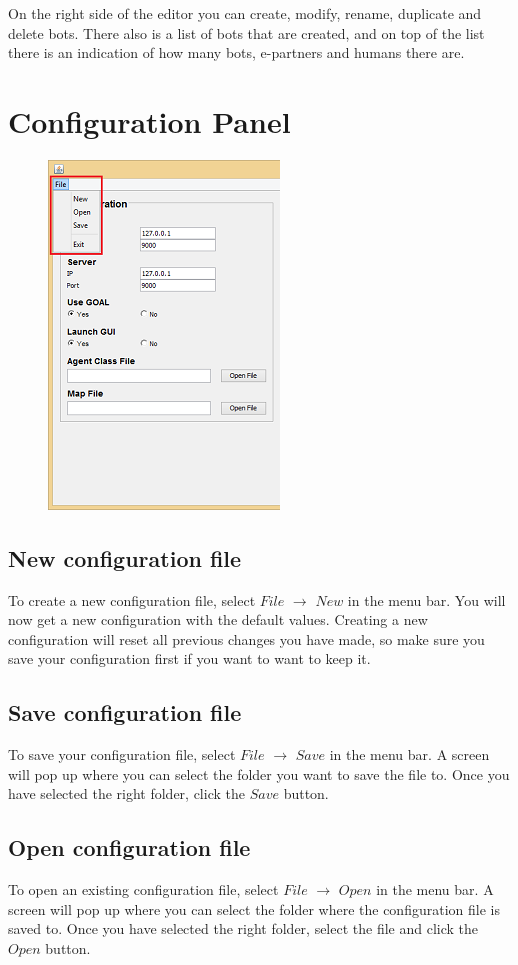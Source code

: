 \documentclass[a4paper]{article}
\begin{document}
On the right side of the editor you can create, modify, rename, duplicate and delete bots. There also is a list of bots that are created, and on top of the list there is an indication of how many bots, e-partners and humans there are.
\pagebreak
\section{Configuration Panel}
\begin{figure}
\includegraphics{config.png}
\end{figure}
\subsection{New configuration file}
To create a new configuration file, select $File$ $\to$ $New$ in the menu bar. You will now get a new configuration with the default values. Creating a new configuration will reset all previous changes you have made, so make sure you save your configuration first if you want to want to keep it.

\subsection{Save configuration file}
To save your configuration file, select $File$ $\to$ $Save$ in the menu bar. A screen will pop up where you can select the folder you want to save the file to. Once you have selected the right folder, click the $Save$ button.

\subsection{Open configuration file}
To open an existing configuration file, select $File$ $\to$ $Open$ in the menu bar. A screen will pop up where you can select the folder where the configuration file is saved to. Once you have selected the right folder, select the file and click the $Open$ button.
\pagebreak
\end{document}

